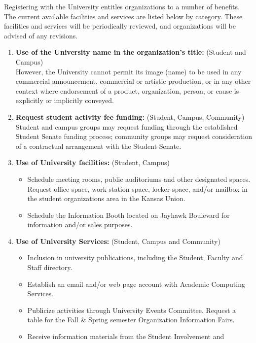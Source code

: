 Registering with the University entitles organizations to a number of benefits.
The current available facilities and services are listed below by category.
These facilities and services will be periodically reviewed, and organizations
will be advised of any revisions.
\begin{enumerate}
  \item \textbf{Use of the University name in the organization's title:}
        (Student and Campus) \\
        However, the University cannot permit its image (name) to be used in any
        commercial announcement, commercial or artistic production, or in any
        other context where endorsement of a product, organization, person, or
        cause is explicitly or implicitly conveyed.
  \item \textbf{Request student activity fee funding:} (Student, Campus,
        Community) \\
        Student and campus groups may request funding through the established
        Student Senate funding process; community groups may request
        consideration of a contractual arrangement with the Student Senate.
  \item \textbf{Use of University facilities:} (Student, Campus)
  \begin{itemize}
    \item Schedule meeting rooms, public auditoriums and other designated spaces.
          Request office space, work station space, locker space, and/or mailbox
          in the student organizations area in the Kansas Union.
    \item Schedule the Information Booth located on Jayhawk Boulevard for
          information and/or sales purposes.
  \end{itemize}
  \item \textbf{Use of University Services:} (Student, Campus and Community)
  \begin{itemize}
    \item Inclusion in university publications, including the Student, Faculty
          and Staff directory.
    \item Establish an email and/or web page account with Academic Computing
          Services.
    \item Publicize activities through University Events Committee. Request a
          table for the Fall \& Spring semester Organization Information Fairs.
    \item Receive information materials from the Student Involvement and

\end{itemize}
\end{enumerate}
